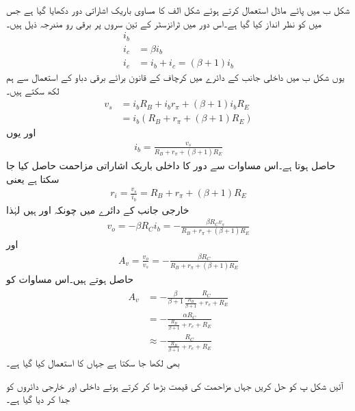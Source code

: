 شکل  ب میں پائے ماڈل استعمال کرتے ہوئے شکل  الف   کا مساوی باریک اشاراتی دور دکھایا گیا ہے جس میں  کو نظر انداز کیا گیا ہے۔اس دور میں ٹرانزسٹر کے تین سروں پر برقی رو مندرجہ ذیل ہیں۔
\begin{align*}
i_b &\\
i_c&=\beta i_b\\
i_e&=i_b+i_c = \left(\beta+1 \right )i_b
\end{align*}
یوں شکل  ب میں داخلی جانب کے دائرے میں کرچاف کے قانون برائے برقی دباو کے استعمال سے ہم لکھ سکتے ہیں۔
\begin{align*}
v_s&=i_b R_B+i_b r_{\pi} + \left(\beta+1 \right ) i_b R_E\\
&=i_b \left(R_B+r_{\pi}+\left(\beta+1 \right )R_E \right )
\end{align*}
اور یوں
\begin{align*}
i_b=\frac{v_s}{R_B+r_{\pi}+\left(\beta+1 \right )R_E}
\end{align*}
حاصل ہوتا ہے۔اس مساوات سے دور کا داخلی باریک اشاراتی مزاحمت حاصل کیا جا سکتا ہے یعنی
\begin{align*}
r_i=\frac{v_s}{i_b}=R_B+r_{\pi}+\left(\beta+1 \right )R_E
\end{align*}
خارجی جانب کے دائرے میں چونکہ  اور   ہیں لہٰذا
\begin{align*}
v_o=-\beta R_C i_b = -\frac{\beta R_C v_s}{R_B+r_{\pi}+\left(\beta+1 \right )R_E}
\end{align*}
اور 
\begin{align}
A_v=\frac{v_o}{v_s}=-\frac{\beta R_C}{R_B +r_{\pi}+\left(\beta+1 \right )R_E}
\end{align}
حاصل ہوتے ہیں۔اس مساوات کو
\begin{gather}
\begin{aligned}\label{مساوات_ٹرانزسٹر_افزائش_کی_عمومی_مساوات}
A_v&=-\frac{\beta}{\beta+1}\frac{R_C}{\frac{R_B}{\beta+1} +r_{e}+R_E}\\
&=-\frac{\alpha R_C}{\frac{R_B}{\beta+1} +r_{e}+R_E}\\
& \approx -\frac{ R_C}{\frac{R_B}{\beta+1} +r_{e}+R_E}
\end{aligned}
\end{gather}
بھی لکھا جا سکتا ہے جہاں  کا استعمال کیا گیا ہے۔

آئیں شکل  پ کو حل کریں جہاں مزاحمت کی قیمت بڑھا کر  کرتے ہوئے داخلی اور خارجی دائروں کو جدا کر دیا گیا ہے۔

